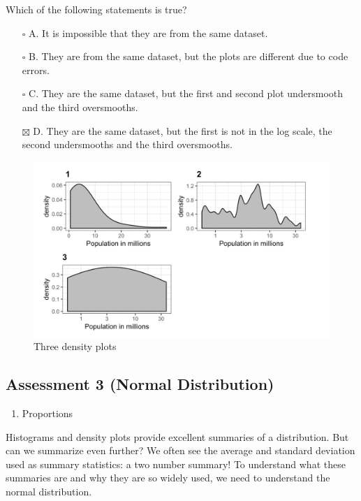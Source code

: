 \documentclass[
]{article}
\providecommand{\tightlist}{%
  \setlength{\itemsep}{0pt}\setlength{\parskip}{0pt}}
\begin{document}
Which of the following statements is true?

\begin{itemize}
\tightlist
\item[$\square$]
  A. It is impossible that they are from the same dataset.
\item[$\square$]
  B. They are from the same dataset, but the plots are different due to
  code errors.
\item[$\square$]
  C. They are the same dataset, but the first and second plot
  undersmooth and the third oversmooths.
\item[$\boxtimes$]
  D. They are the same dataset, but the first is not in the log scale,
  the second undersmooths and the third oversmooths.
\end{itemize}

\begin{figure}
\centering
\includegraphics{images/Three density plots.png}
\caption{Three density plots}
\end{figure}

\hypertarget{assessment-3-normal-distribution}{%
\subsection{Assessment 3 (Normal
Distribution)}\label{assessment-3-normal-distribution}}

\begin{enumerate}
\def\labelenumi{\arabic{enumi}.}
\tightlist
\item
  Proportions
\end{enumerate}

Histograms and density plots provide excellent summaries of a
distribution. But can we summarize even further? We often see the
average and standard deviation used as summary statistics: a two number
summary! To understand what these summaries are and why they are so
widely used, we need to understand the normal distribution.
\end{document}
